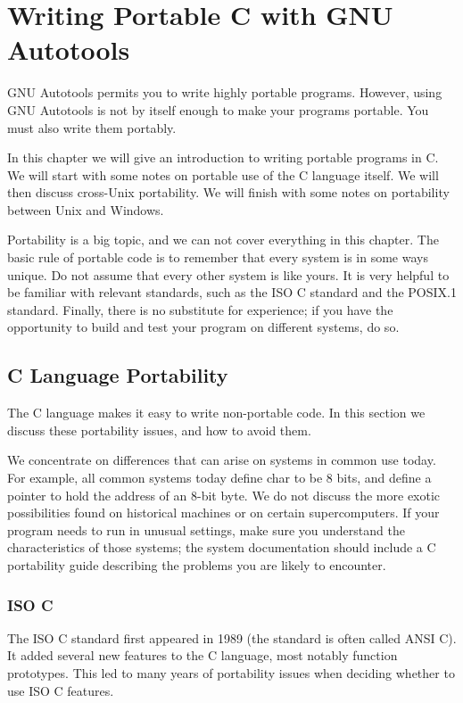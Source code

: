 \chapter{Writing Portable C with GNU Autotools}

GNU Autotools permits you to write highly portable programs. However, using GNU Autotools is not by itself enough to make your programs portable. You must also write them portably.

In this chapter we will give an introduction to writing portable programs in C. We will start with some notes on portable use of the C language itself. We will then discuss cross-Unix portability. We will finish with some notes on portability between Unix and Windows.

Portability is a big topic, and we can not cover everything in this chapter. The basic rule of portable code is to remember that every system is in some ways unique. Do not assume that every other system is like yours. It is very helpful to be familiar with relevant standards, such as the ISO C standard and the POSIX.1 standard. Finally, there is no substitute for experience; if you have the opportunity to build and test your program on different systems, do so. 

\section{C Language Portability}

The C language makes it easy to write non-portable code. In this section we discuss these portability issues, and how to avoid them.

We concentrate on differences that can arise on systems in common use today. For example, all common systems today define char to be 8 bits, and define a pointer to hold the address of an 8-bit byte. We do not discuss the more exotic possibilities found on historical machines or on certain supercomputers. If your program needs to run in unusual settings, make sure you understand the characteristics of those systems; the system documentation should include a C portability guide describing the problems you are likely to encounter. 

\subsection{ISO C}

The ISO C standard first appeared in 1989 (the standard is often called ANSI C). It added several new features to the C language, most notably function prototypes. This led to many years of portability issues when deciding whether to use ISO C features.

